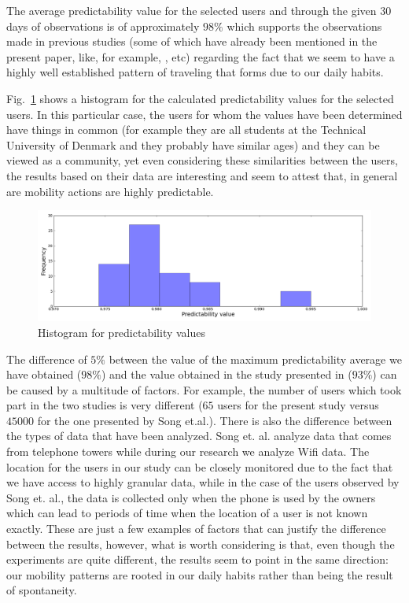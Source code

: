The average predictability value for the selected users and through the given
$30$ days of observations is of approximately $98\%$ which supports the
observations made in previous studies (some of which have already been mentioned
in the present paper, like, for example, \cite{song2010limits},
\cite{Barabasi08} etc) regarding the fact that we seem to have a highly well
established pattern of traveling that forms due to our daily habits.

Fig.~\ref{pred_histo} shows a histogram for the calculated predictability values
for the selected users. In this particular case, the users for whom the values
have been determined have things in common (for example they are all students
at the Technical University of Denmark and they probably have similar ages) and
they can be viewed as a community, yet even considering these similarities
between the users, the results based on their data are interesting and seem to
attest that, in general are mobility actions are highly predictable.

\begin{figure}[!h]
\centering
\includegraphics[width=\textwidth]{figures/entro_pred/pred_hist.png}
\caption{Histogram for predictability values}
\label{pred_histo}
\end{figure}

The difference of $5\%$ between the value of the maximum predictability average
we have obtained ($98\%$) and the value obtained in the study presented in
\cite{song2010limits} ($93\%$) can be caused by a multitude of factors. For
example, the number of users which took part in the two studies is very
different ($65$ users for the present study versus $45000$ for the one presented
by Song et.al.). There is also the difference between the types of data that
have been analyzed. Song et. al. analyze data that comes from telephone towers
while during our research we analyze Wifi data. The location for the users in
our study can be closely monitored due to the fact that we have access to highly
granular data, while in the case of the users observed by Song et. al., the data
is collected only when the phone is used by the owners which can lead to periods
of time when the location of a user is not known exactly. These are just a few
examples of factors that can justify the difference between the results,
however, what is worth considering is that, even though the experiments are
quite different, the results seem to point in the same direction: our mobility
patterns are rooted in our daily habits rather than being the result of
spontaneity.
